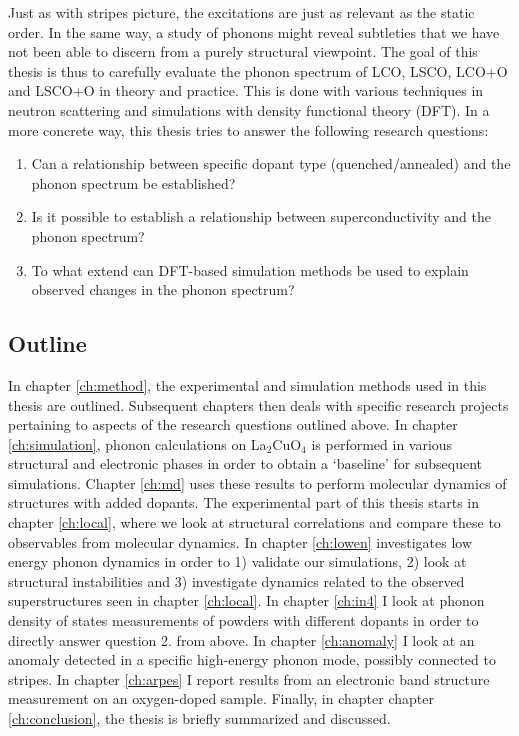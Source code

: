 Just as with stripes picture, the excitations are just as relevant as the static order. In the same way, a study of phonons might reveal subtleties that we have not been able to discern from a purely structural viewpoint. The goal of this thesis is thus to carefully evaluate the phonon spectrum of LCO, LSCO, LCO+O and LSCO+O in theory and practice. This is done with various techniques in neutron scattering and simulations with density functional theory (DFT). In a more concrete way, this thesis tries to answer the following research questions:

\begin{enumerate}
    \item Can a relationship between specific dopant type (quenched/annealed) and the phonon spectrum be established?
    \item Is it possible to establish a relationship between superconductivity and the phonon spectrum?
    \item To what extend can DFT-based simulation methods be used to explain observed changes in the phonon spectrum?
\end{enumerate}

\subsection{Outline}
In chapter \ref{ch:method}, the experimental and simulation methods used in this thesis are outlined. Subsequent chapters then deals with specific research projects pertaining to aspects of the research questions outlined above. In chapter \ref{ch:simulation}, phonon calculations on La$_2$CuO$_4$ is performed in various structural and electronic phases in order to obtain a `baseline' for subsequent simulations. Chapter \ref{ch:md} uses these results to perform molecular dynamics of structures with added dopants. The experimental part of this thesis starts in chapter \ref{ch:local}, where we look at structural correlations and compare these to observables from molecular dynamics. In chapter \ref{ch:lowen} investigates low energy phonon dynamics in order to 1) validate our simulations, 2) look at structural instabilities and 3) investigate dynamics related to the observed superstructures seen in chapter \ref{ch:local}. In chapter \ref{ch:in4} I look at phonon density of states measurements of powders with different dopants in order to directly answer question 2. from above. In chapter \ref{ch:anomaly} I look at an anomaly detected in a specific high-energy phonon mode, possibly connected to stripes. In chapter \ref{ch:arpes} I report results from an electronic band structure measurement on an oxygen-doped sample. Finally, in chapter chapter \ref{ch:conclusion}, the thesis is briefly summarized and discussed.


